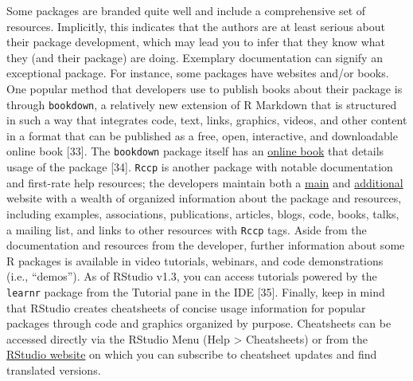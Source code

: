 \documentclass[10pt,letterpaper]{article}
\begin{document}
Some packages are branded quite well and include a comprehensive set of
resources. Implicitly, this indicates that the authors are at least
serious about their package development, which may lead you to infer
that they know what they (and their package) are doing. Exemplary
documentation can signify an exceptional package. For instance, some
packages have websites and/or books. One popular method that developers
use to publish books about their package is through \texttt{bookdown}, a
relatively new extension of R Markdown that is structured in such a way
that integrates code, text, links, graphics, videos, and other content
in a format that can be published as a free, open, interactive, and
downloadable online book {[}33{]}. The \texttt{bookdown} package itself
has an \href{https://bookdown.org/yihui/bookdown/}{online book} that
details usage of the package {[}34{]}. \texttt{Rccp} is another package
with notable documentation and first-rate help resources; the developers
maintain both a \href{http://www.rcpp.org/}{main} and
\href{http://dirk.eddelbuettel.com/code/rcpp.html}{additional} website
with a wealth of organized information about the package and resources,
including examples, associations, publications, articles, blogs, code,
books, talks, a mailing list, and links to other resources with
\texttt{Rccp} tags. Aside from the documentation and resources from the
developer, further information about some R packages is available in
video tutorials, webinars, and code demonstrations (i.e., ``demos''). As
of RStudio v1.3, you can access tutorials powered by the \texttt{learnr}
package from the Tutorial pane in the IDE {[}35{]}. Finally, keep in
mind that RStudio creates cheatsheets of concise usage information for
popular packages through code and graphics organized by purpose.
Cheatsheets can be accessed directly via the RStudio Menu (Help
\textgreater{} Cheatsheets) or from the
\href{https://rstudio.com/resources/cheatsheets/}{RStudio website} on
which you can subscribe to cheatsheet updates and find translated
versions.
\end{document}
